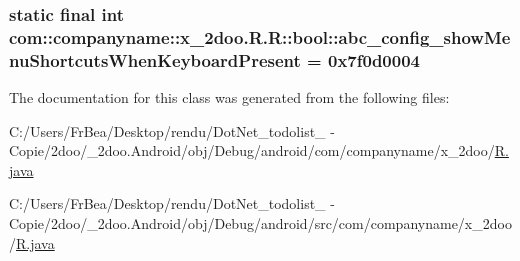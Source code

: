\hypertarget{classcom_1_1companyname_1_1x__2doo_1_1_r_1_1bool_7f096c288d04e24b3b4b68c5e5acccd3}{
\subsubsection[{abc\_\-config\_\-showMenuShortcutsWhenKeyboardPresent}]{\setlength{\rightskip}{0pt plus 5cm}static final int com::companyname::x\_\-2doo.R.R::bool::abc\_\-config\_\-showMenuShortcutsWhenKeyboardPresent = 0x7f0d0004}}
\label{classcom_1_1companyname_1_1x__2doo_1_1_r_1_1bool_7f096c288d04e24b3b4b68c5e5acccd3}




The documentation for this class was generated from the following files:\begin{CompactItemize}
\item 
C:/Users/FrBea/Desktop/rendu/DotNet\_\-todolist\_ - Copie/2doo/\_\-2doo.Android/obj/Debug/android/com/companyname/x\_\-2doo/\hyperlink{com_2companyname_2x__2doo_2_r_8java}{R.java}\item 
C:/Users/FrBea/Desktop/rendu/DotNet\_\-todolist\_ - Copie/2doo/\_\-2doo.Android/obj/Debug/android/src/com/companyname/x\_\-2doo/\hyperlink{src_2com_2companyname_2x__2doo_2_r_8java}{R.java}\end{CompactItemize}

